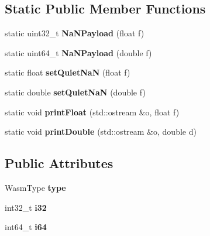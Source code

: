 \subsection*{Static Public Member Functions}
\begin{DoxyCompactItemize}
\item 
\mbox{\label{classwasm_1_1_literal_a34c4501b153e1cd360db867358e41b2f}} 
static uint32\+\_\+t {\bfseries Na\+N\+Payload} (float f)
\item 
\mbox{\label{classwasm_1_1_literal_a032525f76d100140867c8ce1e5a3440a}} 
static uint64\+\_\+t {\bfseries Na\+N\+Payload} (double f)
\item 
\mbox{\label{classwasm_1_1_literal_a9e78114f3c0cb03193f873e3c4b854bc}} 
static float {\bfseries set\+Quiet\+NaN} (float f)
\item 
\mbox{\label{classwasm_1_1_literal_a114822485ddb747c31abd1c0b07150ad}} 
static double {\bfseries set\+Quiet\+NaN} (double f)
\item 
\mbox{\label{classwasm_1_1_literal_ade164822d3b7bee62de138c0d0a6bdab}} 
static void {\bfseries print\+Float} (std\+::ostream \&o, float f)
\item 
\mbox{\label{classwasm_1_1_literal_aeef600b68c28f0bb961a6ce55b0d0603}} 
static void {\bfseries print\+Double} (std\+::ostream \&o, double d)
\end{DoxyCompactItemize}
\subsection*{Public Attributes}
\begin{DoxyCompactItemize}
\item 
\mbox{\label{classwasm_1_1_literal_a0d3ccd7773f5bd164a89c324966062fb}} 
Wasm\+Type {\bfseries type}
\item 
\mbox{\label{classwasm_1_1_literal_ab435d57074cd89cec0a6ad74e1aab17e}} 
int32\+\_\+t {\bfseries i32}
\item 
\mbox{\label{classwasm_1_1_literal_af12ea9c6487531eccc2f5b41730f6937}} 
int64\+\_\+t {\bfseries i64}
\end{DoxyCompactItemize}
